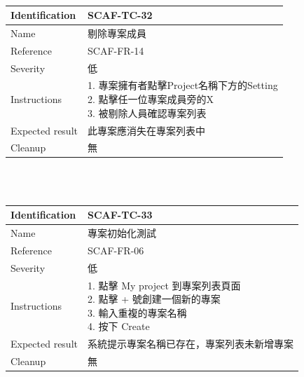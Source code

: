 \documentclass{report}
\begin{document}
\\
\begin{tabularx}{\textwidth}{
  |p{}%
  |p{}|%
  }
  \hline
  \centering Identification &  SCAF-TC-32 \\
  \hline
  \centering Name & 剔除專案成員 \\
  \hline
  \centering Reference & SCAF-FR-14 \\
  \hline
  \centering Severity & 低 \\
  \hline
  \centering Instructions & 
  \makecell[l]{
    1. 專案擁有者點擊Project名稱下方的Setting \\
    2. 點擊任一位專案成員旁的X \\
    3. 被剔除人員確認專案列表
  }\\
  \hline
  \centering Expected result & 此專案應消失在專案列表中 \\
  \hline
  \centering Cleanup & 無 \\
  \hline
\end{tabularx}
\\
\newline
\\
\begin{tabularx}{\textwidth}{
  |p{}%
  |p{}|%
  }
  \hline
  \centering Identification &  SCAF-TC-33 \\
  \hline
  \centering Name & 專案初始化測試 \\
  \hline
  \centering Reference & SCAF-FR-06 \\
  \hline
  \centering Severity & 低 \\
  \hline
  \centering Instructions & 
  \makecell[l]{
    1. 點擊 My project 到專案列表頁面 \\
    2. 點擊 + 號創建一個新的專案 \\
    3. 輸入重複的專案名稱 \\
    4. 按下 Create
  }\\
  \hline
  \centering Expected result & 系統提示專案名稱已存在，專案列表未新增專案 \\
  \hline
  \centering Cleanup & 無 \\
  \hline
\end{tabularx}
\\
\newline
\\
\end{document}
